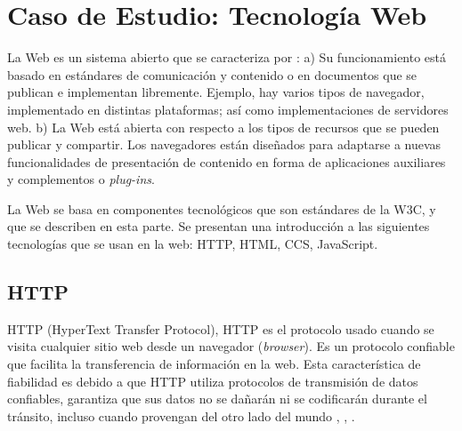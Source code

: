 
\chapter{Caso de Estudio: Tecnología Web}
\label{sec:caso-estudio-A}

La Web es un sistema abierto que se  caracteriza por : a) Su funcionamiento está basado en estándares de comunicación y contenido o en documentos que se publican e implementan libremente. Ejemplo, hay varios tipos de navegador,  implementado en distintas plataformas; así como  implementaciones de servidores web. b) La Web está abierta con respecto a los tipos de \gls{recursos} que se pueden publicar y compartir. Los navegadores están diseñados para adaptarse a nuevas funcionalidades de presentación de contenido en forma de aplicaciones auxiliares y complementos o \textit{plug-ins}.

La Web se basa en  componentes tecnológicos que son  estándares de la W3C,  y que se describen en esta parte. Se presentan una introducción a las siguientes tecnolog\'ias que se usan  en la web: HTTP, HTML, CCS, JavaScript.
 
\section{HTTP}   
	 HTTP (HyperText Transfer Protocol), \gls{HTTP} es el protocolo usado cuando se visita cualquier sitio web desde un navegador (\textit{browser}). Es un protocolo confiable que facilita la transferencia de información en la web. Esta característica de fiabilidad es  debido a que HTTP utiliza protocolos de transmisión de datos confiables, garantiza que sus datos no se dañarán ni se codificarán durante el tránsito, incluso cuando provengan del otro lado del mundo , ,  .

